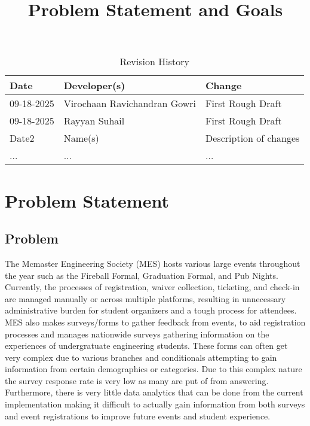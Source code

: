 \documentclass{article}
\title{Problem Statement and Goals\\\progname}
\author{\authname}
\date{}
\begin{document}
\maketitle

\begin{table}[hp]
\caption{Revision History} \label{TblRevisionHistory}
\begin{tabularx}{\textwidth}{llX}
\toprule
\textbf{Date} & \textbf{Developer(s)} & \textbf{Change}\\
\midrule
09-18-2025 & Virochaan Ravichandran Gowri & First Rough Draft\\
09-18-2025 & Rayyan Suhail & First Rough Draft\\
Date2 & Name(s) & Description of changes\\
... & ... & ...\\
\bottomrule
\end{tabularx}
\end{table}

\section{Problem Statement}



\subsection{Problem}
The Mcmaster Engineering Society (MES) hosts various large events throughout the year such as the Fireball Formal, Graduation Formal, and Pub Nights. Currently, the processes of registration, waiver collection, ticketing, and check-in are managed manually or across multiple platforms, resulting in unnecessary administrative burden for student organizers and a tough process for attendees. MES also makes surveys/forms to gather feedback from events, to aid registration processes and manages nationwide surveys gathering information on the experiences of undergratuate engineering students. These forms can often get very complex due to various branches and conditionals attempting to gain information from certain demographics or categories. Due to this complex nature the survey response rate is very low as many are put of from answering. Furthermore, there is very little data analytics that can be done from the current implementation making it difficult to actually gain information from both surveys and event registrations to improve future events and student experience.
\end{document}
